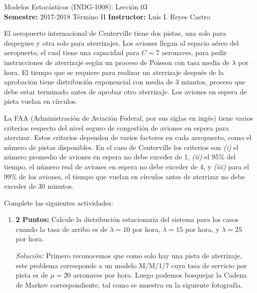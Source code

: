 \documentclass[ a4paper, twoside, 11pt]{article}
\newcommand{\numero}{03}
\begin{document}
\allowdisplaybreaks



\begin{center}
\Large Modelos Estoc\'asticos (INDG-1008): Lecci\'on \numero \\[2ex]
\small \textbf{Semestre:} 2017-2018 T\'ermino II \qquad
\textbf{Instructor:} Luis I. Reyes Castro
\end{center}
\fullskip

\begin{problem}
El aeropuerto internacional de Centerville tiene dos pistas, una solo para despegues y otra solo para aterrizajes. Los aviones llegan al espacio a\'ereo del aeropuerto, el cual tiene una capacidad para $C = 7$ aeronaves, para pedir instrucciones de aterrizaje seg\'un un proceso de Poisson con tasa media de $\lambda$ por hora. El tiempo que se requiere para realizar un aterrizaje despu\'es de la aprobaci\'on tiene distribuci\'on exponencial con media de 3 minutos, proceso que debe estar terminado antes de aprobar otro aterrizaje. Los aviones en espera de pista vuelan en c\'irculos. 

La FAA (Administraci\'on de Aviaci\'on Federal, por sus siglas en ing\'es) tiene varios criterios respecto del nivel seguro de congesti\'on de aviones en espera para aterrizar. Estos criterios dependen de varios factores en cada aeropuerto, como el n\'umero de pistas disponibles. En el caso de Centerville los criterios son \textit{(i)} el n\'umero promedio de aviones en espera no debe exceder de 1, \textit{(ii)} el 95\% del tiempo, el n\'umero real de aviones en espera no debe exceder de 4, y \textit{(iii)} para el 99\% de los aviones, el tiempo que vuelan en c\'irculos antes de aterrizar no debe exceder de 30 minutos. 

Complete las siguientes actividades: 
\begin{enumerate}[label=\textbf{\alph*)}]
\item \textbf{2 Puntos:} Calcule la distribuci\'on estacionaria del sistema para los casos cuando la tasa de arribo es de $\lambda = 10$ por hora, $\lambda = 15$ por hora, y $\lambda = 25$ por hora. 

\emph{Soluci\'on:} Primero reconocemos que como solo hay una pista de aterrizaje, este problema corresponde a un modelo M/M/1/7 cuya tasa de servicio por pista es de $\mu = 20$ aeronaves por hora. Luego podemos bosquejar la Cadena de Markov correspondiente, tal como se muestra en la siguiente fotograf\'ia. 


\end{enumerate}
\end{problem}
\end{document}
